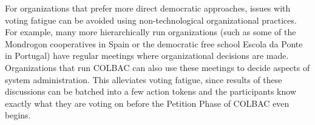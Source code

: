 For organizations that prefer more direct democratic approaches, issues with
voting fatigue can be avoided using non-technological organizational practices.
For example, many more hierarchically run organizations (such as some of the 
Mondrogon cooperatives in Spain or the democratic free school Escola da Ponte in
Portugal) have regular meetings where organizational decisions are made.
Organizations that run COLBAC can also use these meetings to decide aspects of
system administration. This alleviates voting fatigue, since results of these
discussions can be batched into a few action tokens and the participants know
exactly what they are voting on before the Petition Phase of COLBAC even begins.

